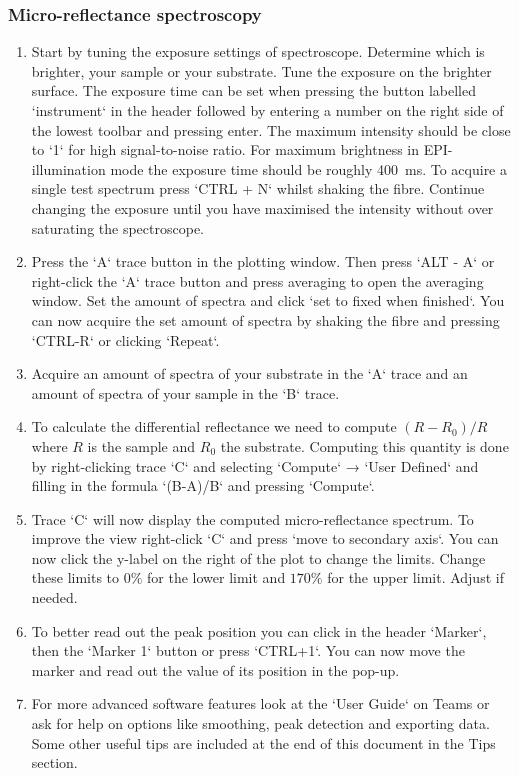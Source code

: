 \documentclass[a4paper]{scrartcl}
\begin{document}
\subsubsection*{Micro-reflectance spectroscopy}
\begin{enumerate}
	\item Start by tuning the exposure settings of spectroscope. Determine which is brighter, your sample or your substrate. Tune the exposure on the brighter surface. The exposure time can be set when pressing the button labelled `instrument` in the header followed by entering a number on the right side of the lowest toolbar and pressing enter. The maximum intensity should be close to `1` for high signal-to-noise ratio. For maximum brightness in EPI-illumination mode the exposure time should be roughly \SI{400}{\milli \second}. To acquire a single test spectrum press `CTRL + N` whilst shaking the fibre. Continue changing the exposure until you have maximised the intensity without over saturating the spectroscope.
	\item Press the `A` trace button in the plotting window. Then press `ALT - A` or right-click the `A` trace button and press averaging to open the averaging window. Set the amount of spectra and click `set to fixed when finished`. You can now acquire the set amount of spectra by shaking the fibre and pressing `CTRL-R` or clicking `Repeat`.
	\item Acquire an amount of spectra of your substrate in the `A` trace and an amount of spectra of your sample in the `B` trace.
	\item To calculate the differential reflectance we need to compute $(R-R_0)/R$ where $R$ is the sample and $R_0$ the substrate. Computing this quantity is done by right-clicking trace `C` and selecting `Compute` → `User Defined` and filling in the formula `(B-A)/B` and pressing `Compute`.
	\item Trace `C` will now display the computed micro-reflectance spectrum. To improve the view right-click `C` and press `move to secondary axis`. You can now click the y-label on the right of the plot to change the limits. Change these limits to $0\%$ for the lower limit and $170\%$ for the upper limit. Adjust if needed.
	\item To better read out the peak position you can click in the header `Marker`, then the `Marker 1` button or press `CTRL+1`. You can now move the marker and read out the value of its position in the pop-up.
	\item For more advanced software features look at the `User Guide` on Teams or ask for help on options like smoothing, peak detection and exporting data.\\
		Some other useful tips are included at the end of this document in the Tips section.
\end{enumerate}
\newpage
\end{document}
